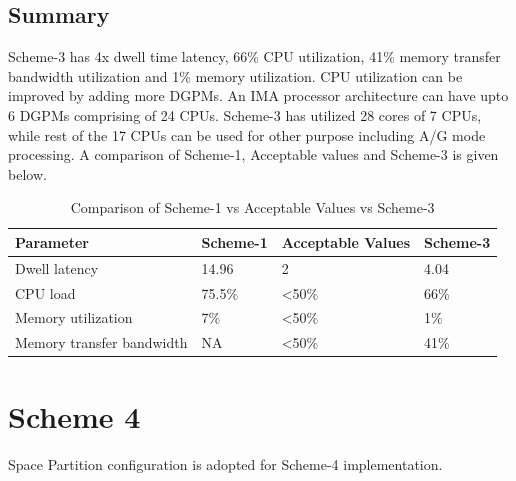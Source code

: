 \subsection{Summary}
\label{ss:mm:scheme4:summary}
Scheme-3 has 4x dwell time latency, 66\% CPU utilization, 41\% memory transfer bandwidth utilization and 1\% memory utilization. CPU utilization can be improved by adding more DGPMs. An IMA processor architecture can have upto 6 DGPMs comprising of 24 CPUs. Scheme-3 has utilized 28 cores of 7 CPUs, while rest of the 17 CPUs can be used for other purpose including A/G mode processing. A comparison of Scheme-1, Acceptable values and Scheme-3 is given below.

\begin{table}[h!]
	\centering
	\begin{tabular}{|l|l|l|l|} 
	 \hline
	 \textbf{Parameter} & \textbf{Scheme-1} & \textbf{Acceptable Values} & \textbf{Scheme-3}\\
	 \hline
	 Dwell latency &  14.96 & 2 & 4.04 \\ \hline
	 CPU load & 75.5\% & \textless 50\% & 66\% \\ \hline
	 Memory utilization & 7\% & \textless 50\%  & 1\% \\ \hline
	 Memory transfer bandwidth & NA & \textless 50\% & 41\%  \\ \hline
	\end{tabular}
	\caption{Comparison of Scheme-1 vs Acceptable Values vs Scheme-3}
	\label{tbl:mm:scheme4_comparison}
\end{table}

\clearpage
\section{Scheme 4}
\label{sec:mm:scheme5}
Space Partition configuration is adopted for Scheme-4 implementation.

